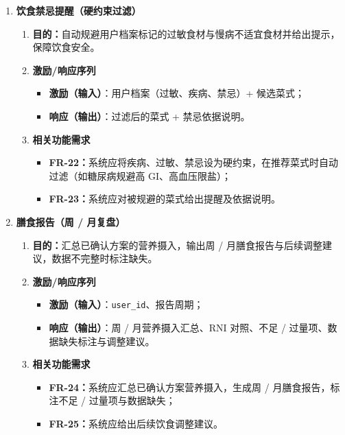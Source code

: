 \documentclass[12pt,a4paper]{ctexart}
\begin{document}
\begin{enumerate}
\item \textbf{饮食禁忌提醒（硬约束过滤）}
  \begin{enumerate}[label=(\arabic*), leftmargin=10pt, itemsep=2pt, topsep=2pt]
    \item \textbf{目的：}自动规避用户档案标记的过敏食材与慢病不适宜食材并给出提示，保障饮食安全。
    \item \textbf{激励/响应序列}
      \begin{itemize}[leftmargin=*, itemsep=1pt, topsep=1pt]
        \item \textbf{激励（输入）}：用户档案（过敏、疾病、禁忌）+ 候选菜式；
        \item \textbf{响应（输出）}：过滤后的菜式 + 禁忌依据说明。
      \end{itemize}
    \item \textbf{相关功能需求}
      \begin{itemize}[leftmargin=*, itemsep=1pt, topsep=1pt]
        \item \textbf{FR-22：}系统应将疾病、过敏、禁忌设为硬约束，在推荐菜式时自动过滤（如糖尿病规避高 GI、高血压限盐）；
        \item \textbf{FR-23：}系统应对被规避的菜式给出提醒及依据说明。
      \end{itemize}
  \end{enumerate}

\item \textbf{膳食报告（周 / 月复盘）}
  \begin{enumerate}[label=(\arabic*), leftmargin=10pt, itemsep=2pt, topsep=2pt]
    \item \textbf{目的：}汇总已确认方案的营养摄入，输出周 / 月膳食报告与后续调整建议，数据不完整时标注缺失。
    \item \textbf{激励/响应序列}
      \begin{itemize}[leftmargin=*, itemsep=1pt, topsep=1pt]
        \item \textbf{激励（输入）}：\texttt{user\_id}、报告周期；
        \item \textbf{响应（输出）}：周 / 月营养摄入汇总、RNI 对照、不足 / 过量项、数据缺失标注与调整建议。
      \end{itemize}
    \item \textbf{相关功能需求}
      \begin{itemize}[leftmargin=*, itemsep=1pt, topsep=1pt]
        \item \textbf{FR-24：}系统应汇总已确认方案营养摄入，生成周 / 月膳食报告，标注不足 / 过量项与数据缺失；
        \item \textbf{FR-25：}系统应给出后续饮食调整建议。
      \end{itemize}
  \end{enumerate}


\end{enumerate}
\end{document}
